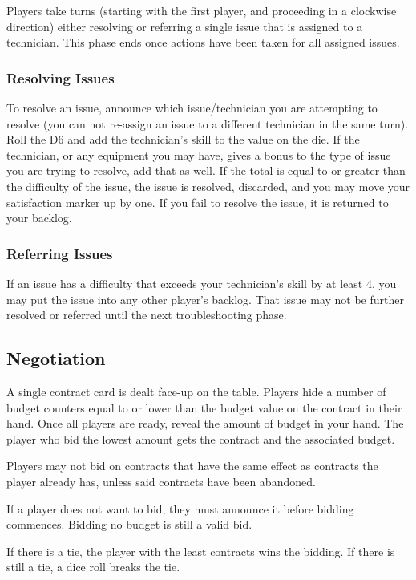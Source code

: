 \documentclass[twocolumn]{article}
\begin{document}
Players take turns (starting with the first player, and proceeding in a clockwise direction) either
resolving or referring a single issue that is assigned to a technician. This phase ends once actions have been taken for all assigned issues.

\subsubsection*{Resolving Issues}

To resolve an issue, announce which issue/technician you are attempting to resolve (you can not re-assign an issue to a different technician in the same turn). Roll the D6 and add the technician's skill to the value on the die. If the technician, or any equipment you may have, gives a bonus to the type of issue you are trying to resolve, add that as well. If the total is equal to or greater than the difficulty of the issue, the issue is resolved, discarded, and you may move your satisfaction marker up by one.
If you fail to resolve the issue, it is returned to your backlog.

\subsubsection*{Referring Issues}

If an issue has a difficulty that exceeds your technician's skill by at least 4, you may put the issue into any other player's backlog. That issue may not be further resolved or referred until the next troubleshooting phase.


\subsection*{Negotiation}

A single contract card is dealt face-up on the table. Players hide a number of budget counters equal to or lower than the budget value on the contract in their hand. Once all players are ready, reveal the amount of budget in your hand. The player who bid the lowest amount gets the contract and the associated budget.

Players may not bid on contracts that have the same effect as contracts the player already has, unless said contracts have been abandoned.

If a player does not want to bid, they must announce it before bidding commences. Bidding no budget is still a valid bid.

If there is a tie, the player with the least contracts wins the bidding. If there is still a tie, a dice roll breaks the tie.
\end{document}
